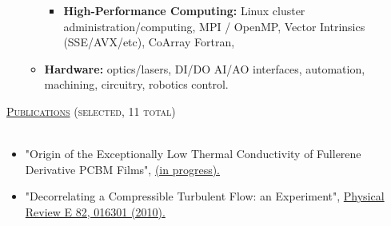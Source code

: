 \documentclass{article}
\newcommand{\lineunder}{\vspace*{-8pt} \\ \hspace*{-18pt} \hrulefill \\}
\newcommand{\header}[1]{{\hspace*{-15pt}\vspace*{6pt} \textsc{#1}} \vspace*{-6pt} \lineunder}
\newenvironment{achievements}{\begin{list}{$\bullet$}{\topsep 0pt \itemsep -2pt}}{\vspace*{4pt}\end{list}}
\begin{document}
\begin{itemize}
\begin{itemize}[leftmargin=*]
\begin{itemize}


    \item \textbf{High-Performance Computing:} Linux cluster administration/computing, MPI / OpenMP, Vector Intrinsics (SSE/AVX/etc), CoArray Fortran, 


  \end{itemize}

  \item \textbf{Hardware:} optics/lasers, DI/DO AI/AO interfaces, automation, machining, circuitry,  robotics control.

 
\end{itemize}


\end{itemize}

\header{\Large{\href{http://jasonlarkin.github.io/pub.html}{Publications} (selected, 11 total)}}
\begin{itemize}[leftmargin=*]
\item "Origin of the Exceptionally Low Thermal Conductivity of Fullerene Derivative  PCBM Films", 
\href{http://jasonlarkin.github.io/projects-phd-pcbm.html}{(in progress).}
\item "Decorrelating a Compressible Turbulent Flow: an Experiment", \href{http://pre.aps.org/abstract/PRE/v82/i1/e016301}{Physical Review E 82, 016301 (2010).}
\end{itemize}
\end{document}
